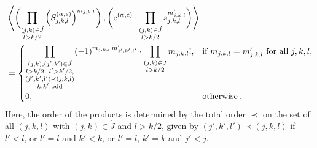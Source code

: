 \documentclass[11pt]{amsart}
\theoremstyle{remark}
\newcommand{\ex}{\textnormal{e}}
\numberwithin{theorem}{section}
\begin{document}
\begin{align}
    \label{equation definition s_jkl by dual}
    & \left\langle \biggl(
        \prod_{ \substack{ (j, k) \in \acute{J} \\ l > k/2 } }
        \left(S^{(\alpha,e)}_{j,k,l}\right)^{m_{j,k,l}}
    \biggr) \,,
    \biggl(
        \ex^{(\alpha,e)} \cdot
        \prod_{ \substack{ (j, k) \in \acute{J} \\ l > k/2 } }
        s_{j,k,l}^{m'_{j,k,l}}
    \biggr) \right\rangle
    \\  \nonumber
    &
    = \begin{cases}
        \displaystyle
        \prod_{ \substack{
            (j, k), (j', k') \in \acute{J} \\
            l > k/2, \ l' > k'/2, \\
            (j',k',l') \prec (j,k,l) \\
            k, k' \text{ odd}
        } } (-1)^{m_{j,k,l} \, m'_{j',k',l'}}
        \cdot
        \prod_{ \substack{ (j, k) \in J \\ l > k/2 } }
        m_{j,k,l}!, &
        \text{if } m_{j,k,l} = m'_{j,k,l} \text{ for all } j,k,l, \\
        0, &
        \text{otherwise}\,.
    \end{cases}
\end{align}
Here, the order of the products is determined by
the total order $\prec$
on the set of all $(j,k,l)$ with $(j,k) \in \acute{J}$ and $l>k/2$,
given by $(j',k',l') \prec (j,k,l)$
if $l'<l$, or $l'=l$ and $k'<k$, or
$l'=l$, $k'=k$ and $j'<j$.
\end{document}
